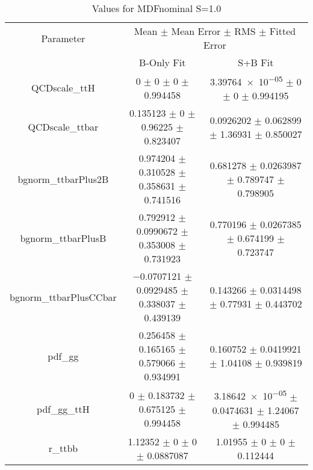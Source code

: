 \begin{table}
\centering
\caption{Values for MDFnominal S=1.0}
\begin{tabular}{ccc}
\toprule
Parameter & \multicolumn{2}{c}{Mean $\pm$ Mean Error $\pm$ RMS $\pm$ Fitted Error}\\
 & B-Only Fit & S+B Fit\\
\midrule
QCDscale\_ttH & \num{0} $\pm$ \num{0} $\pm$ \num{0} $\pm$ \num{0.994458} & \num{3.39764e-05} $\pm$ \num{0} $\pm$ \num{0} $\pm$ \num{0.994195}\\
QCDscale\_ttbar & \num{0.135123} $\pm$ \num{0} $\pm$ \num{0.96225} $\pm$ \num{0.823407} & \num{0.0926202} $\pm$ \num{0.062899} $\pm$ \num{1.36931} $\pm$ \num{0.850027}\\
bgnorm\_ttbarPlus2B & \num{0.974204} $\pm$ \num{0.310528} $\pm$ \num{0.358631} $\pm$ \num{0.741516} & \num{0.681278} $\pm$ \num{0.0263987} $\pm$ \num{0.789747} $\pm$ \num{0.798905}\\
bgnorm\_ttbarPlusB & \num{0.792912} $\pm$ \num{0.0990672} $\pm$ \num{0.353008} $\pm$ \num{0.731923} & \num{0.770196} $\pm$ \num{0.0267385} $\pm$ \num{0.674199} $\pm$ \num{0.723747}\\
bgnorm\_ttbarPlusCCbar & \num{-0.0707121} $\pm$ \num{0.0929485} $\pm$ \num{0.338037} $\pm$ \num{0.439139} & \num{0.143266} $\pm$ \num{0.0314498} $\pm$ \num{0.77931} $\pm$ \num{0.443702}\\
pdf\_gg & \num{0.256458} $\pm$ \num{0.165165} $\pm$ \num{0.579066} $\pm$ \num{0.934991} & \num{0.160752} $\pm$ \num{0.0419921} $\pm$ \num{1.04108} $\pm$ \num{0.939819}\\
pdf\_gg\_ttH & \num{0} $\pm$ \num{0.183732} $\pm$ \num{0.675125} $\pm$ \num{0.994458} & \num{3.18642e-05} $\pm$ \num{0.0474631} $\pm$ \num{1.24067} $\pm$ \num{0.994485}\\
r\_ttbb & \num{1.12352} $\pm$ \num{0} $\pm$ \num{0} $\pm$ \num{0.0887087} & \num{1.01955} $\pm$ \num{0} $\pm$ \num{0} $\pm$ \num{0.112444}\\
\bottomrule
\end{tabular}
\end{table}